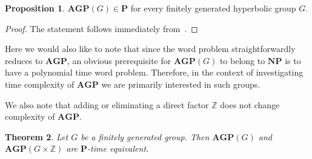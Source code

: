 \documentclass[10pt]{amsart}
\newcommand{\an}{\noindent\color{red} Andrey: }{}
\newtheorem{theorem}{Theorem}[section]
\theoremstyle{definition}
\newtheorem{proposition}[theorem]{Proposition}
\def\P{{\mathbf{P}}}
\def\NP{{\mathbf{NP}}}
\def\AGP{{\mathbf{AGP}}}
\begin{document}
\begin{proposition}\label{pr:agp_hyp}
$\AGP(G)\in\P$ for every finitely generated hyperbolic group $G$.
\end{proposition}
\begin{proof}
The statement follows immediately from~\cite[Proposition 5.5]{Miasnikov-Nikolaev-Ushakov:2014a}.
\end{proof}
Here we would also like to note that since the word problem straightforwardly reduces to $\AGP$, an obvious prerequisite for $\AGP(G)$ to belong to $\NP$ is to have a polynomial time word problem. Therefore, in the context of investigating time complexity of $\AGP$ we are primarily interested in such groups.

We also note that adding or eliminating a direct factor $\mathbb Z$ does not change complexity of $\AGP$.
%
%
%
%




\begin{theorem}\label{th:kill_z}
Let $G$ be a finitely generated group. Then $\AGP(G)$ and $\AGP(G\times \mathbb Z)$ are $\P$-time equivalent.
\end{theorem}
\end{document}
